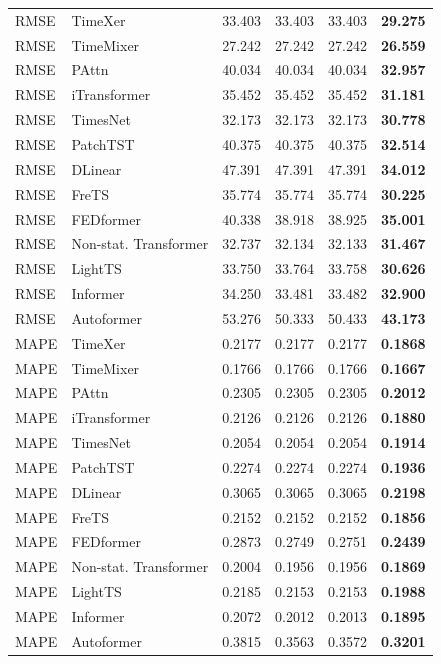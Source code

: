 \begin{longtable}{llrrrr}
\midrule
RMSE & TimeXer & 33.403 & 33.403 & 33.403 & \textbf{29.275} \\
RMSE & TimeMixer & 27.242 & 27.242 & 27.242 & \textbf{26.559} \\
RMSE & PAttn & 40.034 & 40.034 & 40.034 & \textbf{32.957} \\
RMSE & iTransformer & 35.452 & 35.452 & 35.452 & \textbf{31.181} \\
RMSE & TimesNet & 32.173 & 32.173 & 32.173 & \textbf{30.778} \\
RMSE & PatchTST & 40.375 & 40.375 & 40.375 & \textbf{32.514} \\
RMSE & DLinear & 47.391 & 47.391 & 47.391 & \textbf{34.012} \\
RMSE & FreTS & 35.774 & 35.774 & 35.774 & \textbf{30.225} \\
RMSE & FEDformer & 40.338 & 38.918 & 38.925 & \textbf{35.001} \\
RMSE & Non-stat. Transformer & 32.737 & 32.134 & 32.133 & \textbf{31.467} \\
RMSE & LightTS & 33.750 & 33.764 & 33.758 & \textbf{30.626} \\
RMSE & Informer & 34.250 & 33.481 & 33.482 & \textbf{32.900} \\
RMSE & Autoformer & 53.276 & 50.333 & 50.433 & \textbf{43.173} \\
\midrule
MAPE & TimeXer & 0.2177 & 0.2177 & 0.2177 & \textbf{0.1868} \\
MAPE & TimeMixer & 0.1766 & 0.1766 & 0.1766 & \textbf{0.1667} \\
MAPE & PAttn & 0.2305 & 0.2305 & 0.2305 & \textbf{0.2012} \\
MAPE & iTransformer & 0.2126 & 0.2126 & 0.2126 & \textbf{0.1880} \\
MAPE & TimesNet & 0.2054 & 0.2054 & 0.2054 & \textbf{0.1914} \\
MAPE & PatchTST & 0.2274 & 0.2274 & 0.2274 & \textbf{0.1936} \\
MAPE & DLinear & 0.3065 & 0.3065 & 0.3065 & \textbf{0.2198} \\
MAPE & FreTS & 0.2152 & 0.2152 & 0.2152 & \textbf{0.1856} \\
MAPE & FEDformer & 0.2873 & 0.2749 & 0.2751 & \textbf{0.2439} \\
MAPE & Non-stat. Transformer & 0.2004 & 0.1956 & 0.1956 & \textbf{0.1869} \\
MAPE & LightTS & 0.2185 & 0.2153 & 0.2153 & \textbf{0.1988} \\
MAPE & Informer & 0.2072 & 0.2012 & 0.2013 & \textbf{0.1895} \\
MAPE & Autoformer & 0.3815 & 0.3563 & 0.3572 & \textbf{0.3201} \\
\end{longtable}
\endgroup

